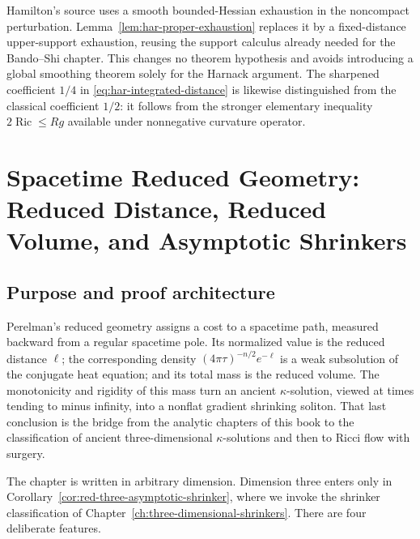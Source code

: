\documentclass[10pt]{coll-l}
\theoremstyle{definition}
\theoremstyle{remark}
\numberwithin{section}{chapter}
\numberwithin{equation}{chapter}
\newcommand{\Ric}{\operatorname{Ric}}
\begin{document}
Hamilton's source uses a smooth bounded-Hessian exhaustion in the
noncompact perturbation.  Lemma~\ref{lem:har-proper-exhaustion} replaces it
by a fixed-distance upper-support exhaustion, reusing the support calculus
already needed for the Bando--Shi chapter.  This changes no theorem
hypothesis and avoids introducing a global smoothing theorem solely for the
Harnack argument.  The sharpened coefficient $1/4$ in
\eqref{eq:har-integrated-distance} is likewise distinguished from the
classical coefficient $1/2$: it follows from the stronger elementary
inequality $2\Ric\leq Rg$ available under nonnegative curvature operator.

\chapter[Spacetime Reduced Geometry]
{Spacetime Reduced Geometry: Reduced Distance, Reduced Volume, and
Asymptotic Shrinkers}
\label{ch:reduced-geometry}

\section{Purpose and proof architecture}
\label{sec:red-purpose}

Perelman's reduced geometry assigns a cost to a spacetime path, measured
backward from a regular spacetime pole.  Its normalized value is the reduced
distance $\ell$; the corresponding density
$(4\pi\tau)^{-n/2}e^{-\ell}$ is a weak subsolution of the conjugate heat
equation; and its total mass is the reduced volume.  The monotonicity and
rigidity of this mass turn an ancient $\kappa$-solution, viewed at times
tending to minus infinity, into a nonflat gradient shrinking soliton.  That
last conclusion is the bridge from the analytic chapters of this book to the
classification of ancient three-dimensional $\kappa$-solutions and then to
Ricci flow with surgery.

The chapter is written in arbitrary dimension.  Dimension three enters only
in Corollary~\ref{cor:red-three-asymptotic-shrinker}, where we invoke the
shrinker classification of Chapter~\ref{ch:three-dimensional-shrinkers}.
There are four deliberate features.
\end{document}
